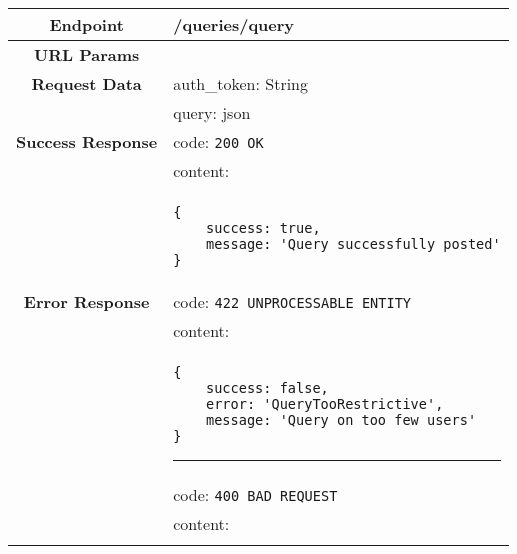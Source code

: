     \begin{adjustwidth}{1cm}{}
        \begin{longtable}{|c|l|}
            \hline
            \textbf{Endpoint} & /queries/query \\
            \hline
            \textbf{URL Params} &  \\
            \hline
            \textbf{Request Data} & auth\_token: String \\
            &                 query: json \\
            \hline
            \textbf{Success Response} & code: \texttt{200 OK} \\
            &                           content: \\
            & \begin{minipage}[t]{0.5\textwidth}
                \begin{adjustwidth}{1.5cm}{}
                \begin{verbatim}
{
    success: true, 
	message: 'Query successfully posted'
}
                \end{verbatim}
                \end{adjustwidth}
              \end{minipage} \\
              \hline
            \textbf{Error Response} & code: \texttt{422 UNPROCESSABLE ENTITY} \\
            &                         content: \\
            & \begin{minipage}[t]{0.7\textwidth}
                \begin{adjustwidth}{1.5cm}{}
                \begin{verbatim}
{
    success: false, 
    error: 'QueryTooRestrictive',
    message: 'Query on too few users'
}
                \end{verbatim}
                \end{adjustwidth}
                \par\noindent\rule{\textwidth}{1pt}
                 \vspace{4pt}
              \end{minipage} \\
              &                     code: \texttt{400 BAD REQUEST} \\
              &                     content: \\
              & \begin{minipage}[t]{0.7\textwidth}

\end{minipage}
\end{longtable}
\end{adjustwidth}

